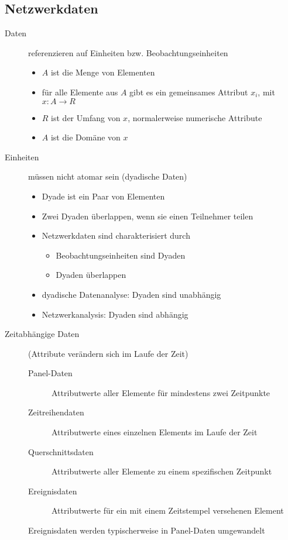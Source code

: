\subsection{Netzwerkdaten}
	\begin{description}
		\item[Daten] referenzieren auf Einheiten bzw. Beobachtungseinheiten
			\begin{itemize}
				\item $A$ ist die Menge von Elementen
				\item für alle Elemente aus $A$ gibt es ein gemeinsames Attribut $x_i$, mit $x:A\rightarrow R$
				\item $R$ ist der Umfang von $x$, normalerweise numerische Attribute
				\item $A$ ist die Domäne von $x$
			\end{itemize}
		\item[Einheiten] müssen nicht atomar sein (dyadische Daten)
			\begin{itemize}
				\item Dyade ist ein Paar von Elementen
				\item Zwei Dyaden überlappen, wenn sie einen Teilnehmer teilen
				\item Netzwerkdaten sind charakterisiert durch
					\begin{itemize}
						\item Beobachtungseinheiten sind Dyaden
						\item Dyaden überlappen
					\end{itemize}
				\item dyadische Datenanalyse: Dyaden sind unabhängig
				\item Netzwerkanalysis: Dyaden sind abhängig
			\end{itemize}
		\item[Zeitabhängige Daten] (Attribute verändern sich im Laufe der Zeit)
			\begin{description}
				\item[Panel-Daten] Attributwerte aller Elemente für mindestens zwei Zeitpunkte
				\item[Zeitreihendaten] Attributwerte eines einzelnen Elements im Laufe der Zeit
				\item[Querschnittsdaten] Attributwerte aller Elemente zu einem spezifischen Zeitpunkt
				\item[Ereignisdaten] Attributwerte für ein mit einem Zeitstempel versehenen Element
			\end{description}
			Ereignisdaten werden typischerweise in Panel-Daten umgewandelt
	\end{description}

